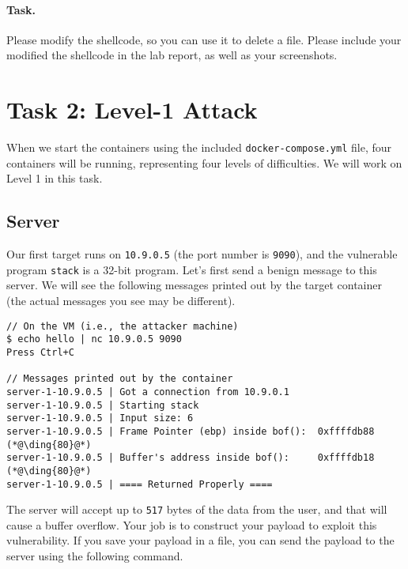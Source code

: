 \paragraph{Task.} Please modify the shellcode, so you can
use it to delete a file.  Please include your modified the shellcode
in the lab report, as well as your screenshots.



\section{Task 2: Level-1 Attack} 


When we start the containers using the included 
\texttt{docker-compose.yml} file, four containers will be 
running, representing four levels of difficulties. 
We will work on Level 1 in this task. 


\subsection{Server} 

Our first target runs on \texttt{10.9.0.5} (the port 
number is \texttt{9090}), and the vulnerable program \texttt{stack}
is a 32-bit program. 
Let's first send a benign message to this server.
We will see the following messages printed out by the target container (the
actual messages you see may be different).


\begin{lstlisting}
// On the VM (i.e., the attacker machine)
$ echo hello | nc 10.9.0.5 9090
Press Ctrl+C

// Messages printed out by the container
server-1-10.9.0.5 | Got a connection from 10.9.0.1
server-1-10.9.0.5 | Starting stack
server-1-10.9.0.5 | Input size: 6
server-1-10.9.0.5 | Frame Pointer (ebp) inside bof():  0xffffdb88    (*@\ding{80}@*)
server-1-10.9.0.5 | Buffer's address inside bof():     0xffffdb18    (*@\ding{80}@*)
server-1-10.9.0.5 | ==== Returned Properly ====
\end{lstlisting}


The server will accept up to \texttt{517} bytes of the data from the 
user, and that will cause a buffer overflow. Your job 
is to construct your payload to exploit this vulnerability. If 
you save your payload in a file, you can send the payload
to the server using the following command.

